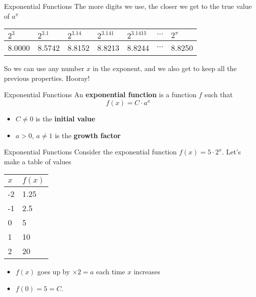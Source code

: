 \documentclass[]{beamer}
\begin{document}
	\begin{frame}{Exponential Functions}
		The more digits we use, the closer we get to the true value of $a^\pi$
		\vfill
		\begin{center}
		\begin{tabular}{@{}lllllcl@{}}
			$2^3$ & $2^{3.1}$ & $2^{3.14}$ & $2^{3.141}$ & $2^{3.1415}$ & $\cdots$ & $2^\pi$\\
			\midrule
			8.0000 & 8.5742 & 8.8152 & 8.8213 & 8.8244 & $\cdots$ & 8.8250
		\end{tabular}
		\end{center}
		\pause
		\vfill
		So we can use any number $x$ in the exponent, and we also get to keep all the previous properties. Hooray!
		\pause
		\vfill
		\begin{block}{Exponential Functions}
			An \textbf{exponential function} is a function $f$ such that
			\begin{equation*}
				f(x) = C\cdot a^x
			\end{equation*} 
			\begin{itemize}
				\item $C\ne 0$ is the \textbf{initial value}
				\item $a > 0$, $a\ne1$ is the \textbf{growth factor} 
			\end{itemize}
		\end{block}
	\end{frame}

	\begin{frame}{Exponential Functions}
		Consider the exponential function $f(x) = 5\cdot 2^x$. Let's make a table of values
		\vfill
		\begin{center}
		\begin{tabular}{@{}ll@{}}
			$x$ & $f(x)$ \\
			\midrule
			-2 & 1.25 \\
			-1 & 2.5 \\
			0 & 5 \\
			1 & 10 \\
			2 & 20
		\end{tabular}
		\end{center}
		\vfill\pause
		\begin{itemize}
			\item $f(x)$ goes up by $\times 2 = a$ each time $x$ increases
			\vfill\pause
			\item $f(0) = 5 = C$.
		\end{itemize}
	\end{frame}
	
\end{document}

